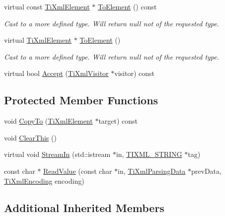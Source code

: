 \begin{DoxyCompactItemize}
virtual const \hyperlink{class_ti_xml_element}{Ti\-Xml\-Element} $\ast$ \hyperlink{class_ti_xml_element_ac5b8d0e25fa23fd9acbb6d146082901c}{To\-Element} () const 
\begin{DoxyCompactList}\small\item\em Cast to a more defined type. Will return null not of the requested type. \end{DoxyCompactList}\item 
virtual \hyperlink{class_ti_xml_element}{Ti\-Xml\-Element} $\ast$ \hyperlink{class_ti_xml_element_a9def86337ea7a755eb41cac980f60c7a}{To\-Element} ()
\begin{DoxyCompactList}\small\item\em Cast to a more defined type. Will return null not of the requested type. \end{DoxyCompactList}\item 
virtual bool \hyperlink{class_ti_xml_element_a31ab28cc3b892a69254391d6bbe08df3}{Accept} (\hyperlink{class_ti_xml_visitor}{Ti\-Xml\-Visitor} $\ast$visitor) const 
\end{DoxyCompactItemize}
\subsection*{Protected Member Functions}
\begin{DoxyCompactItemize}
\item 
void \hyperlink{class_ti_xml_element_a9e0c1983b840de4134f1f6bf7af00b0f}{Copy\-To} (\hyperlink{class_ti_xml_element}{Ti\-Xml\-Element} $\ast$target) const 
\item 
void \hyperlink{class_ti_xml_element_a5670933ec2d7d9763b9891acc05d7f7d}{Clear\-This} ()
\item 
virtual void \hyperlink{class_ti_xml_element_a6884b491fb4708dae566f3ddc1476536}{Stream\-In} (std\-::istream $\ast$in, \hyperlink{tinyxml_8h_a92bada05fd84d9a0c9a5bbe53de26887}{T\-I\-X\-M\-L\-\_\-\-S\-T\-R\-I\-N\-G} $\ast$tag)
\item 
const char $\ast$ \hyperlink{class_ti_xml_element_ac786bce103042d3837c4cc2ff6967d41}{Read\-Value} (const char $\ast$in, \hyperlink{class_ti_xml_parsing_data}{Ti\-Xml\-Parsing\-Data} $\ast$prev\-Data, \hyperlink{tinyxml_8h_a88d51847a13ee0f4b4d320d03d2c4d96}{Ti\-Xml\-Encoding} encoding)
\end{DoxyCompactItemize}
\subsection*{Additional Inherited Members}


